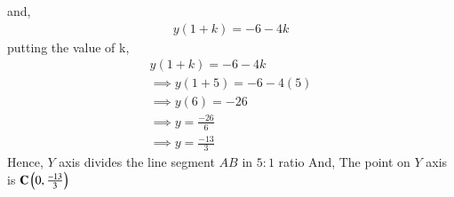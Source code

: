 \documentclass[journal]{IEEEtran}
\numberwithin{equation}{enumi}
\numberwithin{figure}{enumi}
\begin{document}
 and,
 \begin{align*}
     y(1+k)=-6-4k
 \end{align*}
 putting the value of k,
 \begin{align*}
y(1+k)=-6-4k\\
 \implies y(1+5)=-6-4(5)\\
 \implies y(6)=-26\\
 \implies y=\frac{-26}{6}\\
 \implies y=\frac{-13}{3}
 \end{align*}
 Hence, $Y$ axis divides the line segment $AB$ in $5:1$ ratio
 And,
 The point on $Y$ axis is $\mathbf{C}\left(0,\frac{-13}{3}\right)$
\end{document}
